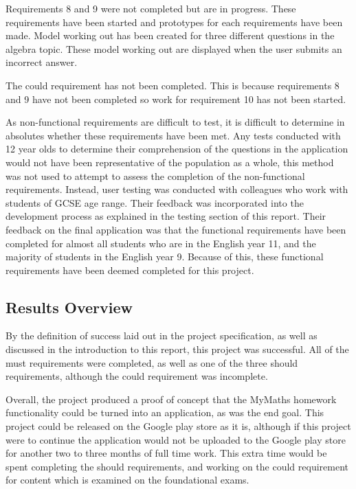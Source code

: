 \documentclass{article}
\begin{document}
Requirements 8 and 9 were not completed but are in progress. These requirements have been started and prototypes for each requirements have been made. Model working out has been created for three different questions in the algebra topic. These model working out are displayed when the user submits an incorrect answer. \par

The could requirement has not been completed. This is because requirements 8 and 9 have not been completed so work for requirement 10 has not been started. \par

As non-functional requirements are difficult to test, it is difficult to determine in absolutes whether these requirements have been met. Any tests conducted with 12 year olds to determine their comprehension of the questions in the application would not have been representative of the population as a whole, this method was not used to attempt to assess the completion of the non-functional requirements. Instead, user testing was conducted with colleagues who work with students of GCSE age range. Their feedback was incorporated into the development process as explained in the testing section of this report. Their feedback on the final application was that the functional requirements have been completed for almost all students who are in the English year 11, and the majority of students in the English year 9. Because of this, these functional requirements have been deemed completed for this project. \par

\subsection{Results Overview}

By the definition of success laid out in the project specification, as well as discussed in the introduction to this report, this project was successful. All of the must requirements were completed, as well as one of the three should requirements, although the could requirement was incomplete. \par

Overall, the project produced a proof of concept that the MyMaths homework functionality could be turned into an application, as was the end goal. This project could be released on the Google play store as it is, although if this project were to continue the application would not be uploaded to the Google play store for another two to three months of full time work. This extra time would be spent completing the should requirements, and working on the could requirement for content which is examined on the foundational exams. \par
\end{document}
